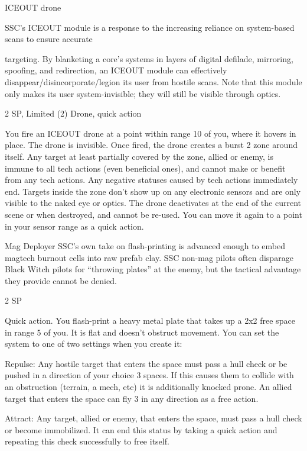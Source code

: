 ICEOUT drone  

SSC’s ICEOUT module is a response to the increasing reliance on system-based scans to ensure accurate  

targeting. By blanketing a core’s systems in layers of digital defilade, mirroring, spoofing, and redirection,  
an ICEOUT module can effectively disappear/disincorporate/legion its user from hostile scans. Note that  
this module only makes its user system-invisible; they will still be visible through optics.    

2 SP, Limited (2)  
Drone, quick action  

You fire an ICEOUT drone at a point within range 10 of you, where it hovers in place. The drone is  
invisible. Once fired, the drone creates a burst 2 zone around itself. Any target at least partially  
covered by the zone, allied or enemy, is immune to all tech actions (even beneficial ones), and  
cannot make or benefit from any tech actions. Any negative statuses caused by tech actions  
immediately end. Targets inside the zone don’t show up on any electronic sensors and are only  
visible to the naked eye or optics. The drone deactivates at the end of the current scene or when  
destroyed, and cannot be re-used. You can move it again to a point in your sensor range as a  
quick action.
 

Mag Deployer  
SSC’s own take on flash-printing is advanced enough to embed magtech burnout cells into raw  
prefab clay. SSC non-mag pilots often disparage Black Witch pilots for “throwing plates” at the  
enemy, but the tactical advantage they provide cannot be denied.   

2 SP  

Quick action.  
You flash-print a heavy metal plate that takes up a 2x2 free space in range 5 of you. It is flat and  
doesn’t obstruct movement. You can set the system to one of two settings when you create it:
 
         Repulse: Any hostile target that enters the space must pass a hull check or be pushed in  
         a direction of your choice 3 spaces. If this causes them to collide with an obstruction  
         (terrain, a mech, etc) it is additionally knocked prone. An allied target that enters the  
         space can fly 3 in any direction as a free action.
 
         Attract: Any target, allied or enemy, that enters the space, must pass a hull check or  
         become immobilized. It can end this status by taking a quick action and repeating this  
         check successfully to free itself.
 
